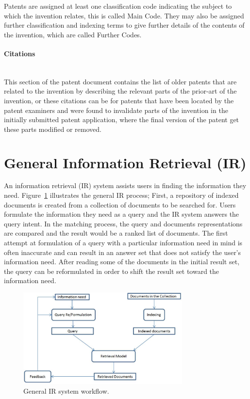 Patents are assigned at least one classification code 
indicating the subject to which the invention relates, this is called Main Code. They may also be assigned further classification and 
indexing terms to give further details of the contents of the invention, which are called Further Codes. 

\paragraph{Citations}
\ \\ 
This section of the patent document contains the list of older patents that are related to the
invention by describing the relevant parts of the prior-art of the invention, or these citations can
be for patents that have been located by the patent examiners and were found to invalidate parts 
of the invention in the initially submitted patent application, where the final version of the patent
get these parts modified or removed.
\section{General Information Retrieval (IR)}
An information retrieval (IR) system assists users in finding the information they need. Figure~\ref{fig:generalir} illustrates the general IR process; First, a repository of indexed documents is created from a collection of documents to be searched for. Users formulate the information they need as a query and the IR system answers the query intent. In the matching process, the query and documents representations are compared and the result would be a ranked list of documents. The first attempt at formulation of a query with a particular information need in mind
is often inaccurate and can result in an answer set that does not satisfy the user's information need. 
After reading some of the documents in the initial result set, the query can be reformulated in order to shift the result set toward the information need.
\begin{figure}[htpb]
   \centering
   \includegraphics[width=.60\textwidth,height=50mm]{figs/generalIR.jpg}
   \caption{General IR system workflow.}  
   \label{fig:generalir} 
\end{figure}
\FloatBarrier 

